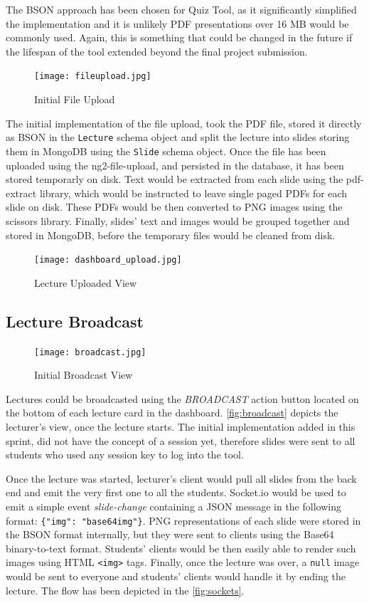 The BSON approach has been chosen for Quiz Tool, as it significantly simplified the implementation and it is
unlikely PDF presentations over 16 MB would be commonly used. Again, this is something that could be changed
in the future if the lifespan of the tool extended beyond the final project submission.

\begin{figure}[h!]
    \centering
    \texttt{[image: fileupload.jpg]}
    \caption{Initial File Upload}
    \label{fig:initialfileupload}
\end{figure}

The initial implementation of the file upload, took the PDF file, stored it directly as BSON in the
\texttt{Lecture} schema object and split the lecture into slides storing them in MongoDB using
the \texttt{Slide} schema object. Once the file has been uploaded using the ng2-file-upload\cite{51},
and persisted in the database, it has been stored temporarly on disk. Text would be extracted from
each slide using the pdf-extract\cite{52} library, which would be instructed to leave single paged
PDFs for each slide on disk. These PDFs would be then converted to PNG images using the scissors\cite{53}
library. Finally, slides' text and images would be grouped together and stored in MongoDB, before the
temporary files would be cleaned from disk.

\begin{figure}[ht]
    \centering
    \texttt{[image: dashboard\_upload.jpg]}
    \caption{Lecture Uploaded View}
    \label{fig:dashboarduploaded}
\end{figure}

\subsection{Lecture Broadcast}
\begin{figure}[h!]
    \centering
    \texttt{[image: broadcast.jpg]}
    \caption{Initial Broadcast View}
    \label{fig:broadcast}
\end{figure}
Lectures could be broadcasted using the \textit{BROADCAST} action button located on the bottom
of each lecture card in the dashboard. \autoref{fig:broadcast} depicts the lecturer's view,
once the lecture starts. The initial implementation added in this sprint, did not have the
concept of a session yet, therefore slides were sent to all students who used any session key
to log into the tool.

Once the lecture was started, lecturer's client would pull all slides from the back end and emit the very
first one to all the students. Socket.io would be used to emit a simple event \textit{slide-change} containing
a JSON message in the following format: \texttt{\{"img": "base64img"\}}. PNG representations of each slide
were stored in the BSON format internally, but they were sent to clients using the Base64 binary-to-text format.
Students' clients would be then easily able to render such images using HTML \texttt{<img>} tags. Finally,
once the lecture was over, a \texttt{null} image would be sent to everyone and students' clients would
handle it by ending the lecture. The flow has been depicted in the \autoref{fig:sockets}.

